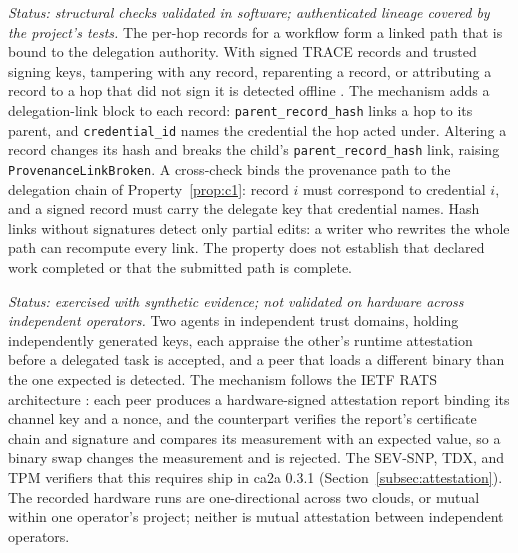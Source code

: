 \begin{property}
\label{prop:c5}
\emph{Status: structural checks validated in software; authenticated lineage covered by the
project's tests.} The per-hop records for a workflow form a linked path that is bound to the
delegation authority. With signed TRACE records and trusted signing keys, tampering with any
record, reparenting a record, or attributing a record to a hop that did not sign it is detected
offline \citep{prov2013}. The mechanism adds a delegation-link block to each record:
\texttt{parent\_record\_hash} links a hop to its parent, and \texttt{credential\_id} names the
credential the hop acted under. Altering a record changes its hash and breaks the child's
\texttt{parent\_record\_hash} link, raising \texttt{ProvenanceLinkBroken}. A cross-check binds the
provenance path to the delegation chain of Property~\ref{prop:c1}: record $i$ must correspond to
credential $i$, and a signed record must carry the delegate key that credential names. Hash links
without signatures detect only partial edits: a writer who rewrites the whole path can recompute
every link. The property does not establish that declared work completed or that the submitted
path is complete.
\end{property}

\begin{property}
\label{prop:c6}
\emph{Status: exercised with synthetic evidence; not validated on hardware across independent
operators.} Two agents in independent trust domains, holding independently generated keys, each
appraise the other's runtime attestation before a delegated task is accepted, and a peer that
loads a different binary than the one expected is detected. The mechanism follows the IETF RATS
architecture \citep{rats2021}: each peer produces a hardware-signed attestation report binding its
channel key and a nonce, and the counterpart verifies the report's certificate chain and
signature and compares its measurement with an expected value, so a binary swap changes the
measurement and is rejected. The SEV-SNP, TDX, and TPM verifiers that this requires ship in ca2a
0.3.1 (Section~\ref{subsec:attestation}). The recorded hardware runs are one-directional across
two clouds, or mutual within one operator's project; neither is mutual attestation between
independent operators.
\end{property}
